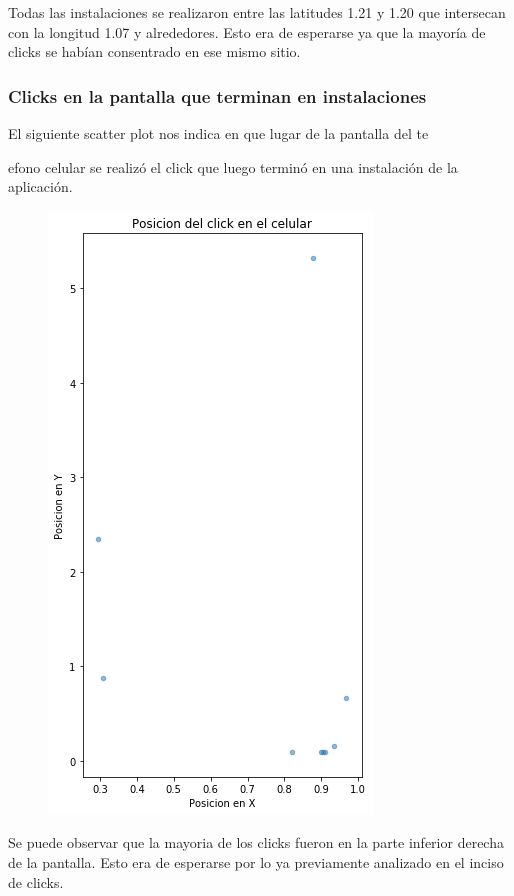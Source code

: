 \documentclass[a4paper, 12pt]{article}
\begin{document}
{	
	Todas las instalaciones se realizaron entre las latitudes 1.21 y 1.20 que intersecan con la longitud 1.07 y alrededores. Esto era de esperarse ya que la mayoría de clicks se habían consentrado en ese mismo sitio.
	
	\clearpage
	\subsubsection{Clicks en la pantalla que terminan en instalaciones}
	 El siguiente scatter plot nos indica en que lugar de la pantalla del te{efono celular se realizó el click que luego terminó en una instalación de la aplicación.
	
	
		\begin{figure}[H]
			\centering
			\includegraphics[scale = 0.5]{images/clicks-installs/touch_pos.png}
			\caption{}
		\end{figure}
	
	
	Se puede observar que la mayoria de los clicks fueron en la parte inferior derecha de la pantalla. Esto era de esperarse por lo ya previamente analizado en el inciso de clicks.
	
}}
\end{document}
